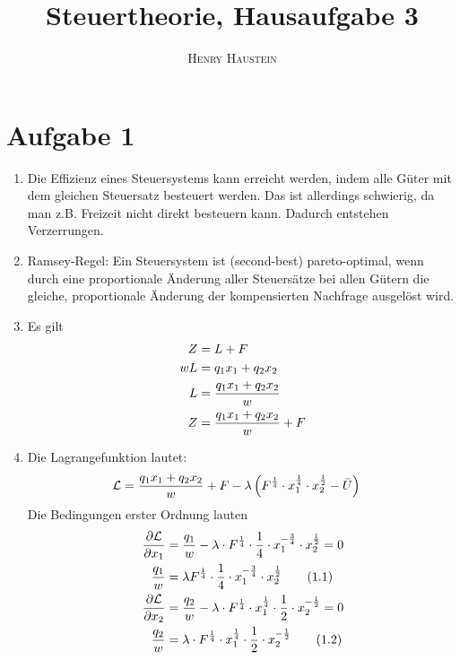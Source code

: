 \documentclass{article}
\title{\textbf{Steuertheorie, Hausaufgabe 3}}
\author{\textsc{Henry Haustein}}
\date{}
\begin{document}
	\maketitle
	
	\section*{Aufgabe 1}
	\begin{enumerate}[label=(\alph*)]
		\item Die Effizienz eines Steuersystems kann erreicht werden, indem alle Güter mit dem gleichen Steuersatz besteuert werden. Das ist allerdings schwierig, da man z.B. Freizeit nicht direkt besteuern kann. Dadurch entstehen Verzerrungen.
		\item Ramsey-Regel: Ein Steuersystem ist (second-best) pareto-optimal, wenn durch eine proportionale Änderung aller Steuersätze bei allen Gütern die gleiche, proportionale Änderung der kompensierten Nachfrage ausgelöst wird.
		\item Es gilt
		\begin{align}
			Z &= L+F \notag \\
			wL &= q_1x_1 + q_2x_2 \notag \\
			L &= \frac{q_1x_1 + q_2x_2}{w} \notag \\
			Z &= \frac{q_1x_1+q_2x_2}{w} + F \notag
		\end{align}
		\item Die Lagrangefunktion lautet:
		\begin{align}
			\mathcal{L} &= \frac{q_1x_1+q_2x_2}{w} + F - \lambda\left(F^\frac{1}{4}\cdot x_1^\frac{1}{4}\cdot x_2^\frac{1}{2} - \bar{U}\right) \notag
		\end{align}
		Die Bedingungen erster Ordnung lauten
		\begin{align}
			\frac{\partial\mathcal{L}}{\partial x_1} &= \frac{q_1}{w} - \lambda \cdot F^\frac{1}{4}\cdot \frac{1}{4}\cdot x_1^{-\frac{3}{4}}\cdot x_2^\frac{1}{2} = 0 \notag \\
			\label{1.1}
			\frac{q_1}{w} &= \lambda F^\frac{1}{4}\cdot \frac{1}{4}\cdot x_1^{-\frac{3}{4}}\cdot x_2^\frac{1}{2} \tag{1.1} \\
			\frac{\partial \mathcal{L}}{\partial x_2} &= \frac{q_2}{w} - \lambda\cdot F^\frac{1}{4}\cdot x_1^\frac{1}{4}\cdot\frac{1}{2}\cdot x_2^{-\frac{1}{2}} = 0 \notag \\
			\label{1.2}
			\frac{q_2}{w} &= \lambda\cdot F^\frac{1}{4}\cdot x_1^\frac{1}{4}\cdot\frac{1}{2}\cdot x_2^{-\frac{1}{2}} \tag{1.2} \\

\end{align}
\end{enumerate}
\end{document}
